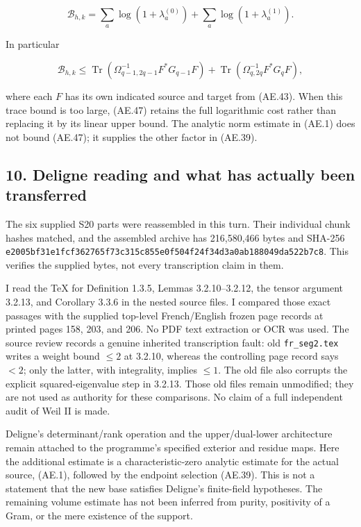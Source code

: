 \[
 \boxed{\mathcal B_{h,k}
 =\sum_a\log(1+\lambda_a^{(0)})
   +\sum_a\log(1+\lambda_a^{(1)}).}                                    \tag{AE.47}\label{AE.eq.47}
\]

In particular

\[
 \mathcal B_{h,k}\le
 \operatorname{Tr}(\Omega_{q-1,2q-1}^{-1}F^*G_{q-1}F)
 +\operatorname{Tr}(\Omega_{q,2q}^{-1}F^*G_qF),                          \tag{AE.48}\label{AE.eq.48}
\]

where each \(F\) has its own indicated source and target from (AE.43). When
this trace bound is too large, (AE.47) retains the full logarithmic cost
rather than replacing it by its linear upper bound. The analytic norm
estimate in (AE.1) does not bound (AE.47); it supplies the other factor in
(AE.39).

\subsection*{10. Deligne reading and what has actually been
transferred}
\label{AE.deligne-reading-and-what-has-actually-been-transferred}

The six supplied S20 parts were reassembled in this turn. Their
individual chunk hashes matched, and the assembled archive has
216,580,466 bytes and SHA-256
\texttt{e2005bf3\allowbreak 1e1fcf36\allowbreak 2765f73c\allowbreak 315c855e\allowbreak 0f504f24\allowbreak f34d3a0a\allowbreak b188049d\allowbreak a522b7c8}.
This verifies the supplied bytes, not every transcription claim in them.

I read the TeX for Definition 1.3.5, Lemmas 3.2.10--3.2.12, the tensor
argument 3.2.13, and Corollary 3.3.6 in the nested source files. I
compared those exact passages with the supplied top-level French/English
frozen page records at printed pages 158, 203, and 206. No PDF text
extraction or OCR was used. The source review records a genuine
inherited transcription fault: old \texttt{fr\_seg2.tex} writes a weight
bound \(\le2\) at 3.2.10, whereas the controlling page record says
\(<2\); only the latter, with integrality, implies \(\le1\). The old
file also corrupts the explicit squared-eigenvalue step in 3.2.13. Those
old files remain unmodified; they are not used as authority for these
comparisons. No claim of a full independent audit of Weil II is made.

Deligne's determinant/rank operation and the upper/dual-lower
architecture remain attached to the programme's specified exterior and
residue maps. Here the additional estimate is a characteristic-zero
analytic estimate for the actual source, (AE.1), followed by the endpoint
selection (AE.39). This is not a statement that the new base satisfies
Deligne's finite-field hypotheses. The remaining volume estimate has not
been inferred from purity, positivity of a Gram, or the mere existence
of the support.

